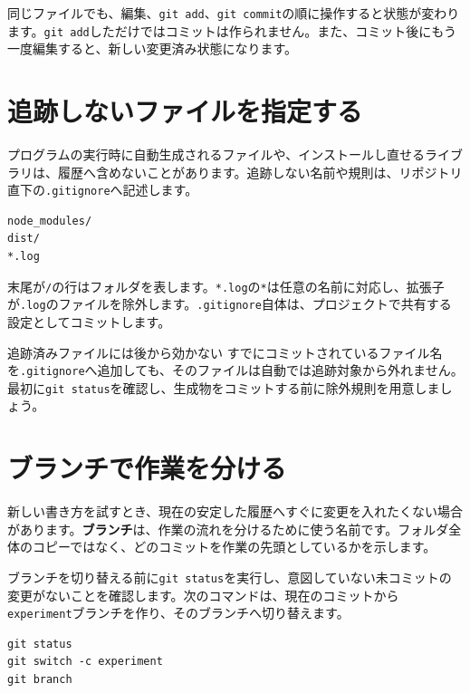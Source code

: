 同じファイルでも、編集、\texttt{git add}、\texttt{git commit}の順に操作すると状態が変わります。\texttt{git add}しただけではコミットは作られません。また、コミット後にもう一度編集すると、新しい変更済み状態になります。

\section{追跡しないファイルを指定する}

プログラムの実行時に自動生成されるファイルや、インストールし直せるライブラリは、履歴へ含めないことがあります。追跡しない名前や規則は、リポジトリ直下の\texttt{.gitignore}へ記述します。

\begin{listing}[htbp]
\begin{verbatim}
node_modules/
dist/
*.log
\end{verbatim}
\caption{\texttt{.gitignore}へ書く除外規則の例}
\label{lst:appendix-git-ignore}
\end{listing}

末尾が\texttt{/}の行はフォルダを表します。\texttt{*.log}の\texttt{*}は任意の名前に対応し、拡張子が\texttt{.log}のファイルを除外します。\texttt{.gitignore}自体は、プロジェクトで共有する設定としてコミットします。

\begin{notebox}{追跡済みファイルには後から効かない}
すでにコミットされているファイル名を\texttt{.gitignore}へ追加しても、そのファイルは自動では追跡対象から外れません。最初に\texttt{git status}を確認し、生成物をコミットする前に除外規則を用意しましょう。
\end{notebox}

\section{ブランチで作業を分ける}

新しい書き方を試すとき、現在の安定した履歴へすぐに変更を入れたくない場合があります。\textbf{ブランチ}は、作業の流れを分けるために使う名前です。フォルダ全体のコピーではなく、どのコミットを作業の先頭としているかを示します。

ブランチを切り替える前に\texttt{git status}を実行し、意図していない未コミットの変更がないことを確認します。次のコマンドは、現在のコミットから\texttt{experiment}ブランチを作り、そのブランチへ切り替えます。

\begin{listing}[htbp]
\begin{verbatim}
git status
git switch -c experiment
git branch
\end{verbatim}
\caption{作業用ブランチを作成して切り替えるコマンド}
\label{lst:appendix-git-create-branch}
\end{listing}

